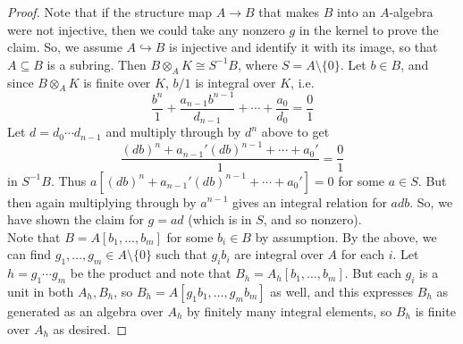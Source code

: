 \begin{proof}
	Note that if the structure map $A \to B$ that makes $B$ into an $A$-algebra were not injective, then we could take any nonzero $g$ in the kernel to prove the claim. So, we assume $A \hookrightarrow B$ is injective and identify it with its image, so that $A \subseteq B$ is a subring. Then $B \otimes_A K \cong S^{-1}B$, where $S = A \setminus \{0\}$. Let $b \in B$, and since $B \otimes_A K$ is finite over $K$, $b/1$ is integral over $K$, i.e.
	\[ \frac{b^n}{1} + \frac{a_{n-1}b^{n-1}}{d_{n-1}} + \cdots + \frac{a_0}{d_0} = \frac01 \]
	Let $d = d_0 \cdots d_{n-1}$ and multiply through by $d^n$ above to get
	\[ \frac{(db)^n + a_{n-1}'(db)^{n-1} + \cdots + a_0'}{1} = \frac01 \]
	in $S^{-1}B$. Thus $a[(db)^n + a_{n-1}'(db)^{n-1} + \cdots + a_0'] = 0$ for some $a \in S$. But then again multiplying through by $a^{n-1}$ gives an integral relation for $adb$. So, we have shown the claim for $g = ad$ (which is in $S$, and so nonzero). \\
	
	Note that $B = A[b_1,\ldots,b_m]$ for some $b_i \in B$ by assumption. By the above, we can find $g_1,\ldots,g_m \in A \setminus \{0\}$ such that $g_ib_i$ are integral over $A$ for each $i$. Let $h = g_1 \cdots g_m$ be the product and note that $B_h = A_h[b_1,\ldots,b_m]$. But each $g_i$ is a unit in both $A_h,B_h$, so $B_h = A[g_1b_1,\ldots,g_mb_m]$ as well, and this expresses $B_h$ as generated as an algebra over $A_h$ by finitely many integral elements, so $B_h$ is finite over $A_h$ as desired. 
\end{proof}
